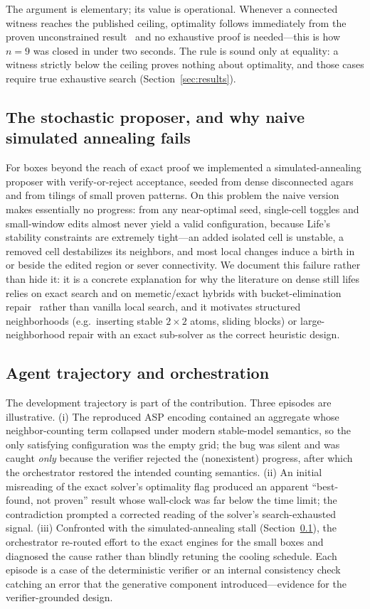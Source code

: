 \documentclass{article}
\begin{document}
The argument is elementary; its value is operational. Whenever a connected witness reaches the published ceiling, optimality follows immediately from the proven unconstrained result~\citep{chu2012} and no exhaustive proof is needed---this is how $n=9$ was closed in under two seconds. The rule is sound only at equality: a witness strictly below the ceiling proves nothing about optimality, and those cases require true exhaustive search (Section~\ref{sec:results}).

\subsection{The stochastic proposer, and why naive simulated annealing fails}
\label{sec:sa}
For boxes beyond the reach of exact proof we implemented a simulated-annealing proposer with verify-or-reject acceptance, seeded from dense disconnected agars and from tilings of small proven patterns. On this problem the naive version makes essentially no progress: from any near-optimal seed, single-cell toggles and small-window edits almost never yield a valid configuration, because Life's stability constraints are extremely tight---an added isolated cell is unstable, a removed cell destabilizes its neighbors, and most local changes induce a birth in or beside the edited region or sever connectivity. We document this failure rather than hide it: it is a concrete explanation for why the literature on dense still lifes relies on exact search and on memetic/exact hybrids with bucket-elimination repair~\citep{gallardo2009} rather than vanilla local search, and it motivates structured neighborhoods (e.g.\ inserting stable $2\times 2$ atoms, sliding blocks) or large-neighborhood repair with an exact sub-solver as the correct heuristic design.

\subsection{Agent trajectory and orchestration}
\label{sec:trajectory}
The development trajectory is part of the contribution. Three episodes are illustrative. (i) The reproduced ASP encoding contained an aggregate whose neighbor-counting term collapsed under modern stable-model semantics, so the only satisfying configuration was the empty grid; the bug was silent and was caught \emph{only} because the verifier rejected the (nonexistent) progress, after which the orchestrator restored the intended counting semantics. (ii) An initial misreading of the exact solver's optimality flag produced an apparent ``best-found, not proven'' result whose wall-clock was far below the time limit; the contradiction prompted a corrected reading of the solver's search-exhausted signal. (iii) Confronted with the simulated-annealing stall (Section~\ref{sec:sa}), the orchestrator re-routed effort to the exact engines for the small boxes and diagnosed the cause rather than blindly retuning the cooling schedule. Each episode is a case of the deterministic verifier or an internal consistency check catching an error that the generative component introduced---evidence for the verifier-grounded design.
\end{document}

